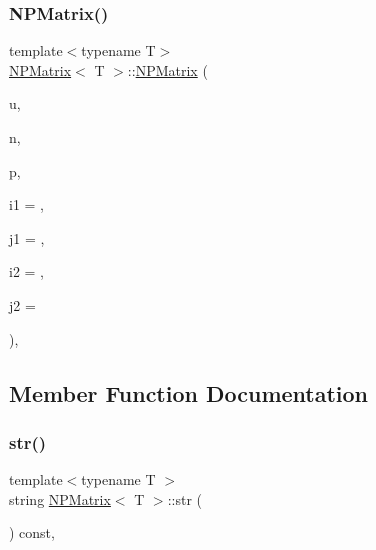 \subsubsection{\texorpdfstring{NPMatrix()}{NPMatrix()}\hspace{0.1cm}{\footnotesize\ttfamily [7/7]}}
{\footnotesize\ttfamily template$<$typename T$>$ \\
\mbox{\hyperlink{class_n_p_matrix}{N\+P\+Matrix}}$<$ T $>$\+::\mbox{\hyperlink{class_n_p_matrix}{N\+P\+Matrix}} (\begin{DoxyParamCaption}\item[{const \mbox{\hyperlink{class_n_vector}{N\+Vector}}$<$ T $>$ \&}]{u,  }\item[{\mbox{\hyperlink{group___n_algebra_ga1b140a2034db3f5dfe18a987745df43a}{ul\+\_\+t}}}]{n,  }\item[{\mbox{\hyperlink{group___n_algebra_ga1b140a2034db3f5dfe18a987745df43a}{ul\+\_\+t}}}]{p,  }\item[{\mbox{\hyperlink{group___n_algebra_ga1b140a2034db3f5dfe18a987745df43a}{ul\+\_\+t}}}]{i1 = {},  }\item[{\mbox{\hyperlink{group___n_algebra_ga1b140a2034db3f5dfe18a987745df43a}{ul\+\_\+t}}}]{j1 = {},  }\item[{\mbox{\hyperlink{group___n_algebra_ga1b140a2034db3f5dfe18a987745df43a}{ul\+\_\+t}}}]{i2 = {},  }\item[{\mbox{\hyperlink{group___n_algebra_ga1b140a2034db3f5dfe18a987745df43a}{ul\+\_\+t}}}]{j2 = {} }\end{DoxyParamCaption})\hspace{0.3cm}{\ttfamily [explicit]}, {\ttfamily [protected]}}



\subsection{Member Function Documentation}
\mbox{\label{class_n_p_matrix_ac60d089a0a4b6d0a1df3cf549f50028d}} 
\subsubsection{\texorpdfstring{str()}{str()}}
{\footnotesize\ttfamily template$<$typename T $>$ \\
string \mbox{\hyperlink{class_n_p_matrix}{N\+P\+Matrix}}$<$ T $>$\+::str (\begin{DoxyParamCaption}{ }\end{DoxyParamCaption}) const\hspace{0.3cm}{\ttfamily [override]}, {\ttfamily [virtual]}}



